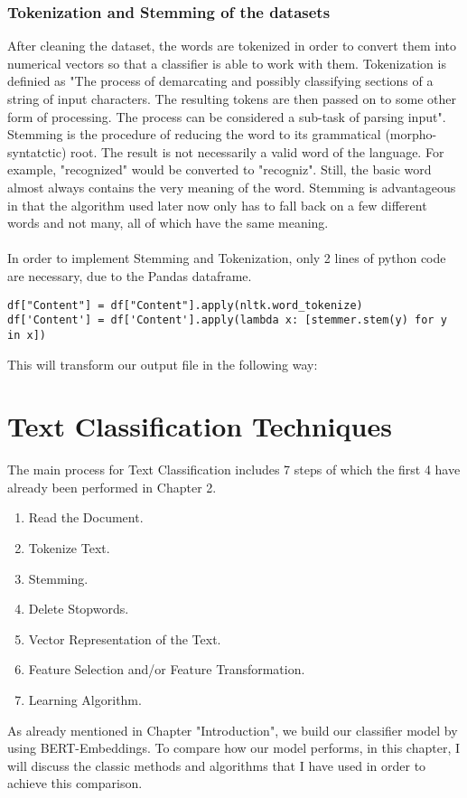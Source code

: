 \documentclass[a4paper, 11pt,titlepage,oneside,openany]{book}
\begin{document}
\subsection{Tokenization and Stemming of the datasets}
After cleaning the dataset, the words are tokenized in order to convert them into numerical vectors so that a classifier is able to work with them. Tokenization is definied as "The process of demarcating and possibly classifying sections of a string of input characters. The resulting tokens are then passed on to some other form of processing. The process can be considered a sub-task of parsing input".\\
\noindent Stemming is the procedure of reducing the word to its grammatical (morpho-syntatctic) root. The result is not necessarily a valid word of the language. For example, "recognized" would be converted to "recogniz". Still, the basic word almost always contains the very meaning of the word. Stemming is advantageous in that the algorithm used later now only has to fall back on a few different words and not many, all of which have the same meaning.\\
\\
\noindent In order to implement Stemming and Tokenization, only 2 lines of python code are necessary, due to the Pandas dataframe. \\
\noindent
\begin{minipage}{\linewidth}
\begin{lstlisting}[frame=single]
df["Content"] = df["Content"].apply(nltk.word_tokenize)
df['Content'] = df['Content'].apply(lambda x: [stemmer.stem(y) for y in x])
\end{lstlisting}
\end{minipage}
This will transform our output file in the following way:

\chapter{Text Classification Techniques}
\noindent The main process for Text Classification includes 7 steps of which the first 4 have already been performed in Chapter 2.
\begin{enumerate}
	\item Read the Document.  
	\item Tokenize Text.
	\item Stemming.
	\item Delete Stopwords.
	\item Vector Representation of the Text.
	\item Feature Selection and/or Feature Transformation.
	\item Learning Algorithm.
\end{enumerate}
As already mentioned in Chapter "Introduction", we build our classifier model by using BERT-Embeddings. To compare how our model performs, in this chapter, I will discuss the classic methods and algorithms that I have used in order to achieve this comparison. \\	
\end{document}
